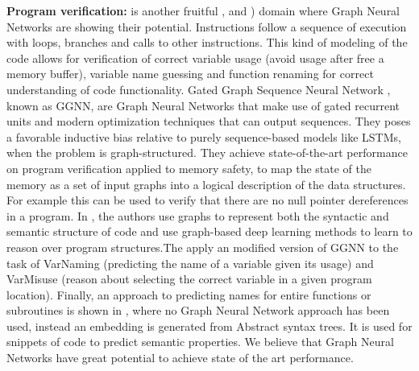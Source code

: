\textbf{Program verification:} is another fruitful \cite{ggnn}, \cite{139} and \cite{code2vec}) domain where Graph Neural Networks are showing their potential. Instructions follow a sequence of execution with loops, branches and calls to other instructions. This kind of modeling of the code allows for verification of correct variable usage (avoid usage after free a memory buffer), variable name guessing and function renaming for correct understanding of code functionality. Gated Graph Sequence Neural Network \cite{ggnn}, known as GGNN, are Graph Neural Networks that make use of gated recurrent units and modern optimization techniques that can output sequences. They poses a favorable inductive bias relative to purely sequence-based models like LSTMs, when the problem is graph-structured. They achieve state-of-the-art performance on program verification applied to memory safety, to map the state of the memory as a set of input graphs into a logical description of the data structures. For example this can be used to verify that there are no null pointer dereferences in a program. In \cite{139}, the authors use graphs to represent both the syntactic and semantic structure of code and use graph-based deep learning methods to learn to reason over program structures.The apply an modified version of GGNN to the task of VarNaming (predicting the name of a variable given its usage) and VarMisuse (reason about selecting the correct variable in a given program location). Finally, an approach to predicting names for entire functions or subroutines is shown in \cite{code2vec}, where no Graph Neural Network approach has been used, instead an embedding is generated from Abstract syntax trees. It is used for snippets of code to predict semantic properties. We believe that Graph Neural Networks have great potential to achieve state of the art performance.







